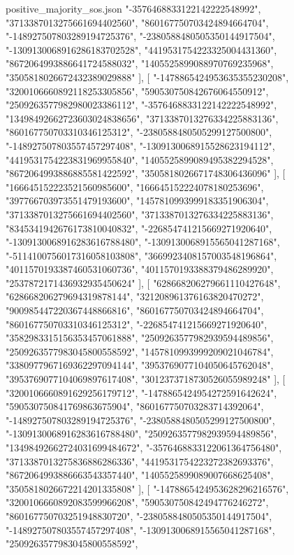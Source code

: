 \begin{filecontents*}[overwrite]{positive_majority_sos.json}
    "-3576468833122142222548992",
    "3713387013275661694402560",
    "860167750703424894664704",
    "-148927507803289194725376",
    "-2380588480505350144917504",
    "-1309130068916286183702528",
    "4419531754223325004431360",
    "8672064993886641724588032",
    "1405525899088970769235968",
    "3505818026672432389029888"
   ],
   [
    "-1478865424953635355230208",
    "3200106660892118253305856",
    "590530750842676064550912",
    "2509263577982980023386112",
    "-3576468833122142222548992",
    "13498492662723603024838656",
    "3713387013276334225883136",
    "860167750703310346125312",
    "-2380588480505299127500800",
    "-148927507803557457297408",
    "-1309130068915528623194112",
    "4419531754223831969955840",
    "1405525899089495382294528",
    "8672064993886885581422592",
    "3505818026671748306436096"
   ],
   [
    "166645152223521560985600",
    "166645152224078180253696",
    "397766703973551479193600",
    "1457810993999183351906304",
    "3713387013275661694402560",
    "3713387013276334225883136",
    "8345341942676173810040832",
    "-226854741215669271920640",
    "-1309130068916283616788480",
    "-1309130068915565041287168",
    "-5114100756017316058103808",
    "3669923408157003548196864",
    "4011570193387460531060736",
    "4011570193388379486289920",
    "2537872171436932935450624"
   ],
   [
    "628668206279661110427648",
    "628668206279694319878144",
    "321208961376163820470272",
    "900985447220367448866816",
    "860167750703424894664704",
    "860167750703310346125312",
    "-226854741215669271920640",
    "3582983315156353457061888",
    "2509263577982939594489856",
    "2509263577983045800558592",
    "1457810993999209021046784",
    "3380977967169362297094144",
    "3953769077104050645762048",
    "3953769077104069897617408",
    "3012373718730526055989248"
   ],
   [
    "3200106660891629256179712",
    "-1478865424954272591642624",
    "590530750841769863675904",
    "860167750703283714392064",
    "-148927507803289194725376",
    "-2380588480505299127500800",
    "-1309130068916283616788480",
    "2509263577982939594489856",
    "13498492662724031699484672",
    "-3576468833122061364756480",
    "3713387013275836886286336",
    "4419531754223272382693376",
    "8672064993886663543357440",
    "1405525899089007668625408",
    "3505818026672214201335808"
   ],
   [
    "-1478865424953628296216576",
    "3200106660892083599966208",
    "590530750842494776246272",
    "860167750703251948830720",
    "-2380588480505350144917504",
    "-148927507803557457297408",
    "-1309130068915565041287168",
    "2509263577983045800558592",

\end{filecontents*}
